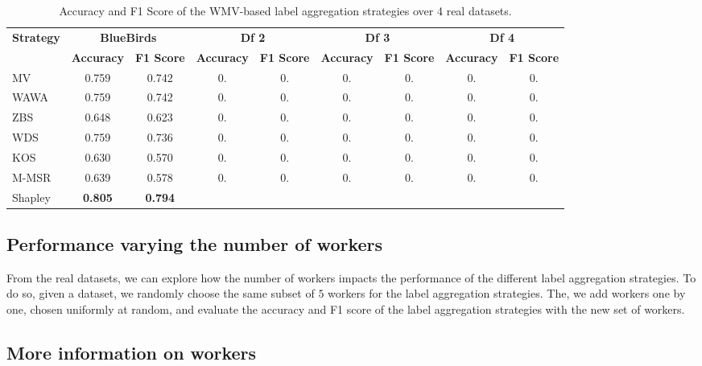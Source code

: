 \documentclass{cap2024}
\begin{document}
\begin{table}[h]
  \centering
  \caption{Accuracy and F1 Score of the WMV-based label aggregation strategies over 4 real datasets.}
  \label{tab:scores}
  \footnotesize{
  \begin{tabular}{l|cc|cc|cc|cc}
  \hline
  \multirow{2}{*}{\textbf{Strategy}} & \multicolumn{2}{c|}{\textbf{BlueBirds}} & \multicolumn{2}{c|}{\textbf{Df 2}} & \multicolumn{2}{c|}{\textbf{Df 3}} & \multicolumn{2}{c}{\textbf{Df 4}} \\
  \cline{2-9}
   & \textbf{Accuracy} & \textbf{F1 Score} & \textbf{Accuracy} & \textbf{F1 Score} & \textbf{Accuracy} & \textbf{F1 Score} & \textbf{Accuracy} & \textbf{F1 Score} \\
  \hline
  MV    & 0.759 & 0.742 & 0. & 0. & 0. & 0. & 0. & 0. \\
  WAWA  & 0.759 & 0.742 & 0. & 0. & 0. & 0. & 0. & 0. \\
  ZBS   & 0.648 & 0.623 & 0. & 0. & 0. & 0. & 0. & 0. \\
  WDS   & 0.759 & 0.736 & 0. & 0. & 0. & 0. & 0. & 0. \\
  KOS   & 0.630 & 0.570 & 0. & 0. & 0. & 0. & 0. & 0. \\
  M-MSR & 0.639 & 0.578 & 0. & 0. & 0. & 0. & 0. & 0. \\
  \rowcolor{lightgray} Shapley & \textbf{0.805}& \textbf{0.794}& & & & & & \\

  \hline
  \end{tabular}
  }
  \end{table}
\subsection{Performance varying the number of workers}

From the real datasets, we can explore how the number of workers impacts the performance of the different label aggregation strategies.
To do so, given a dataset, we randomly choose the same subset of $5$ workers for the label aggregation strategies.
The, we add workers one by one, chosen uniformly at random, and evaluate the accuracy and F1 score of the label aggregation strategies with the new set of workers.

\subsection{More information on workers}
\end{document}
